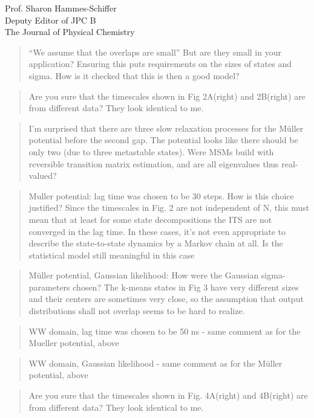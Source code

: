 \documentclass{letter}
\begin{document}
\begin{letter}{Prof. Sharon Hammes-Schiffer \\ Deputy Editor of JPC B \\ The Journal of Physical Chemistry}
\begin{quote}
``We assume that the overlaps are small'' But are they small in your application? Ensuring this puts requirements on the sizes of states and sigma. How is it checked that this is then a good model?
\end{quote}

\begin{quote}
Are you sure that the timescales shown in Fig 2A(right) and 2B(right) are from different data? They look identical to me.
\end{quote}

\begin{quote}
I’m surprised that there are three slow relaxation processes for the Müller potential before the second gap. The potential looks like there should be only two (due to three metastable states). Were MSMs build with reversible transition matrix estimation, and are all eigenvalues thus real-valued?
\end{quote}

\begin{quote}
Muller potential: lag time was chosen to be 30 steps. How is this choice justified? Since the timescales in Fig. 2 are not independent of N, this must mean that at least for some state decompositions the ITS are not converged in the lag time. In these cases, it’s not even appropriate to describe the state-to-state dynamics by a Markov chain at all. Is the statistical model still meaningful in this case
\end{quote}

\begin{quote}
Müller potential, Gaussian likelihood: How were the Gaussian sigma-parameters chosen? The k-means states in Fig 3 have very different sizes and their centers are sometimes very close, so the assumption that output distributions shall not overlap seems to be hard to realize.
\end{quote}

\begin{quote}
WW domain, lag time was chosen to be 50 ns - same comment as for the Mueller potential, above
\end{quote}

\begin{quote}
WW domain, Gaussian likelihood - same comment as for the Müller potential, above
\end{quote}

\begin{quote}
Are you sure that the timescales shown in Fig. 4A(right) and 4B(right) are from different data? They look identical to me.
\end{quote}


\end{letter}
\end{document}
